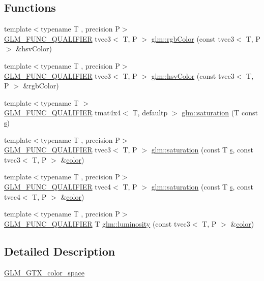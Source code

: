 \subsection*{Functions}
\begin{DoxyCompactItemize}
\item 
{\footnotesize template$<$typename T , precision P$>$ }\\\mbox{\hyperlink{setup_8hpp_a33fdea6f91c5f834105f7415e2a64407}{G\+L\+M\+\_\+\+F\+U\+N\+C\+\_\+\+Q\+U\+A\+L\+I\+F\+I\+ER}} tvec3$<$ T, P $>$ \mbox{\hyperlink{group__gtx__color__space_ga36b0619e31daf57bc4a54dac2dcf34b7}{glm\+::rgb\+Color}} (const tvec3$<$ T, P $>$ \&hsv\+Color)
\item 
{\footnotesize template$<$typename T , precision P$>$ }\\\mbox{\hyperlink{setup_8hpp_a33fdea6f91c5f834105f7415e2a64407}{G\+L\+M\+\_\+\+F\+U\+N\+C\+\_\+\+Q\+U\+A\+L\+I\+F\+I\+ER}} tvec3$<$ T, P $>$ \mbox{\hyperlink{group__gtx__color__space_gae72039c00a7be2f03a3b94b37a54349a}{glm\+::hsv\+Color}} (const tvec3$<$ T, P $>$ \&rgb\+Color)
\item 
{\footnotesize template$<$typename T $>$ }\\\mbox{\hyperlink{setup_8hpp_a33fdea6f91c5f834105f7415e2a64407}{G\+L\+M\+\_\+\+F\+U\+N\+C\+\_\+\+Q\+U\+A\+L\+I\+F\+I\+ER}} tmat4x4$<$ T, defaultp $>$ \mbox{\hyperlink{group__gtx__color__space_gafecfb15d58da8445103745af3348e516}{glm\+::saturation}} (T const \mbox{\hyperlink{glad_8h_af1b1d5edfea6a34daee7389b1b5810ad}{s}})
\item 
{\footnotesize template$<$typename T , precision P$>$ }\\\mbox{\hyperlink{setup_8hpp_a33fdea6f91c5f834105f7415e2a64407}{G\+L\+M\+\_\+\+F\+U\+N\+C\+\_\+\+Q\+U\+A\+L\+I\+F\+I\+ER}} tvec3$<$ T, P $>$ \mbox{\hyperlink{group__gtx__color__space_ga632ee8dadb44e90a05885f6f8c07d46c}{glm\+::saturation}} (const T \mbox{\hyperlink{glad_8h_af1b1d5edfea6a34daee7389b1b5810ad}{s}}, const tvec3$<$ T, P $>$ \&\mbox{\hyperlink{glad_8h_a69995a929d818b8b467d4593c24d98bc}{color}})
\item 
{\footnotesize template$<$typename T , precision P$>$ }\\\mbox{\hyperlink{setup_8hpp_a33fdea6f91c5f834105f7415e2a64407}{G\+L\+M\+\_\+\+F\+U\+N\+C\+\_\+\+Q\+U\+A\+L\+I\+F\+I\+ER}} tvec4$<$ T, P $>$ \mbox{\hyperlink{group__gtx__color__space_ga2033e0566c595230714af396744e8a61}{glm\+::saturation}} (const T \mbox{\hyperlink{glad_8h_af1b1d5edfea6a34daee7389b1b5810ad}{s}}, const tvec4$<$ T, P $>$ \&\mbox{\hyperlink{glad_8h_a69995a929d818b8b467d4593c24d98bc}{color}})
\item 
{\footnotesize template$<$typename T , precision P$>$ }\\\mbox{\hyperlink{setup_8hpp_a33fdea6f91c5f834105f7415e2a64407}{G\+L\+M\+\_\+\+F\+U\+N\+C\+\_\+\+Q\+U\+A\+L\+I\+F\+I\+ER}} T \mbox{\hyperlink{group__gtx__color__space_gaa2f38a5100c3e1c7d39920df43bd8cbe}{glm\+::luminosity}} (const tvec3$<$ T, P $>$ \&\mbox{\hyperlink{glad_8h_a69995a929d818b8b467d4593c24d98bc}{color}})
\end{DoxyCompactItemize}


\subsection{Detailed Description}
\mbox{\hyperlink{group__gtx__color__space}{G\+L\+M\+\_\+\+G\+T\+X\+\_\+color\+\_\+space}} 